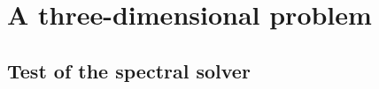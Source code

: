 \documentclass{report}
\begin{document}
        
    \newpage
    
    \section*{A three-dimensional problem}
    
        
        \subsection*{Test of the spectral solver}
            
            \begin{figure}[H]
                \centering
                {\graphicspath{{../problem_3D_easy/error_spectral/}}}
            \end{figure}
            
        
    \newpage
    
\end{document}
